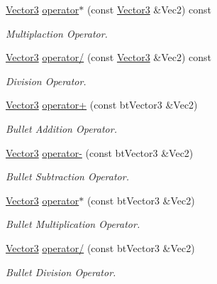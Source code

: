 \begin{DoxyCompactItemize}
\hyperlink{classphys_1_1Vector3}{Vector3} \hyperlink{classphys_1_1Vector3_aa148f18ae4cae10a4aae4170351d7c11}{operator$\ast$} (const \hyperlink{classphys_1_1Vector3}{Vector3} \&Vec2) const 
\begin{DoxyCompactList}\small\item\em Multiplaction Operator. \item\end{DoxyCompactList}\item 
\hyperlink{classphys_1_1Vector3}{Vector3} \hyperlink{classphys_1_1Vector3_af8db5066a9509a5d1b7d568ef576dc6e}{operator/} (const \hyperlink{classphys_1_1Vector3}{Vector3} \&Vec2) const 
\begin{DoxyCompactList}\small\item\em Division Operator. \item\end{DoxyCompactList}\item 
\hyperlink{classphys_1_1Vector3}{Vector3} \hyperlink{classphys_1_1Vector3_a70c99d125274635b07b0fe90bcc15a8c}{operator+} (const btVector3 \&Vec2)
\begin{DoxyCompactList}\small\item\em Bullet Addition Operator. \item\end{DoxyCompactList}\item 
\hyperlink{classphys_1_1Vector3}{Vector3} \hyperlink{classphys_1_1Vector3_ab7ec10d90e35c2b153a2f002f12518ce}{operator-\/} (const btVector3 \&Vec2)
\begin{DoxyCompactList}\small\item\em Bullet Subtraction Operator. \item\end{DoxyCompactList}\item 
\hyperlink{classphys_1_1Vector3}{Vector3} \hyperlink{classphys_1_1Vector3_a59f8b8d5c15f4b047100480ad26ba092}{operator$\ast$} (const btVector3 \&Vec2)
\begin{DoxyCompactList}\small\item\em Bullet Multiplication Operator. \item\end{DoxyCompactList}\item 
\hyperlink{classphys_1_1Vector3}{Vector3} \hyperlink{classphys_1_1Vector3_a945287bb9448b2353c90e16c6cfed876}{operator/} (const btVector3 \&Vec2)
\begin{DoxyCompactList}\small\item\em Bullet Division Operator. \item\end{DoxyCompactList}\item 

\end{DoxyCompactItemize}
